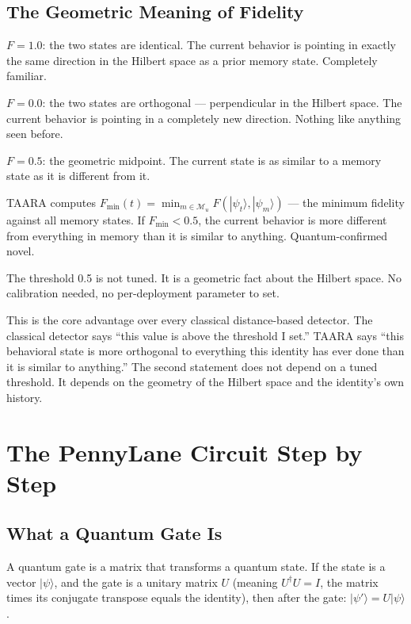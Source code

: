 \documentclass[11pt,a4paper]{article}
\newcommand{\ket}[1]{|#1\rangle}
\begin{document}
\subsection{The Geometric Meaning of Fidelity}

$F = 1.0$: the two states are identical. The current behavior is pointing in exactly the same direction in the Hilbert space as a prior memory state. Completely familiar.

$F = 0.0$: the two states are orthogonal — perpendicular in the Hilbert space. The current behavior is pointing in a completely new direction. Nothing like anything seen before.

$F = 0.5$: the geometric midpoint. The current state is as similar to a memory state as it is different from it.

TAARA computes $F_{\min}(t) = \min_{m \in \mathcal{M}_u} F(\ket{\psi_t}, \ket{\psi_m})$ — the minimum fidelity against all memory states. If $F_{\min} < 0.5$, the current behavior is more different from everything in memory than it is similar to anything. Quantum-confirmed novel.

The threshold 0.5 is not tuned. It is a geometric fact about the Hilbert space. No calibration needed, no per-deployment parameter to set.

\begin{insight}
This is the core advantage over every classical distance-based detector. The classical detector says ``this value is above the threshold I set.'' TAARA says ``this behavioral state is more orthogonal to everything this identity has ever done than it is similar to anything.'' The second statement does not depend on a tuned threshold. It depends on the geometry of the Hilbert space and the identity's own history.
\end{insight}

\section{The PennyLane Circuit Step by Step}

\subsection{What a Quantum Gate Is}

A quantum gate is a matrix that transforms a quantum state. If the state is a vector $\ket{\psi}$, and the gate is a unitary matrix $U$ (meaning $U^\dagger U = I$, the matrix times its conjugate transpose equals the identity), then after the gate: $\ket{\psi'} = U\ket{\psi}$.
\end{document}
